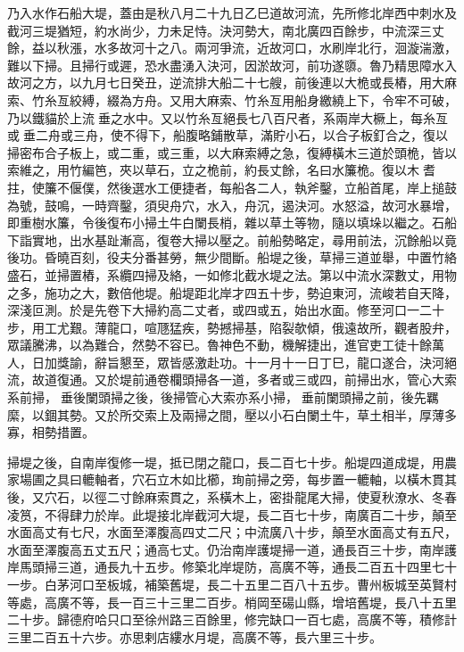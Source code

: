 \begin{pinyinscope}
 乃入水作石船大堤，蓋由是秋八月二十九日乙巳道故河流，先所修北岸西中刺水及截河三堤猶短，約水尚少，力未足恃。決河勢大，南北廣四百餘步，中流深三丈餘，益以秋漲，水多故河十之八。兩河爭流，近故河口，水刷岸北行，洄漩湍激，難以下掃。且掃行或遲，恐水盡湧入決河，因淤故河，前功遂隳。魯乃精思障水入故河之方，以九月七日癸丑，逆流排大船二十七艘，前後連以大桅或長樁，用大麻索、竹糸亙絞縛，綴為方舟。又用大麻索、竹糸亙用船身繳繞上下，令牢不可破，乃以鐵貓於上流垂之水中。又以竹糸亙絕長七八百尺者，系兩岸大橛上，每糸亙或垂二舟或三舟，使不得下，船腹略鋪散草，滿貯小石，以合子板釘合之，復以掃密布合子板上，或二重，或三重，以大麻索縛之急，復縛橫木三道於頭桅，皆以索維之，用竹編笆，夾以草石，立之桅前，約長丈餘，名曰水簾桅。復以木耆拄，使簾不偃僕，然後選水工便捷者，每船各二人，執斧鑿，立船首尾，岸上搥鼓為號，鼓鳴，一時齊鑿，須臾舟穴，水入，舟沉，遏決河。水怒溢，故河水暴增，即重樹水簾，令後復布小掃土牛白闌長梢，雜以草土等物，隨以填垛以繼之。石船下詣實地，出水基趾漸高，復卷大掃以壓之。前船勢略定，尋用前法，沉餘船以竟後功。昏曉百刻，役夫分番甚勞，無少間斷。船堤之後，草掃三道並舉，中置竹絡盛石，並掃置樁，系纜四掃及絡，一如修北截水堤之法。第以中流水深數丈，用物之多，施功之大，數倍他堤。船堤距北岸才四五十步，勢迫東河，流峻若自天降，深淺叵測。於是先卷下大掃約高二丈者，或四或五，始出水面。修至河口一二十步，用工尤艱。薄龍口，喧豗猛疾，勢撼掃基，陷裂欹傾，俄遠故所，觀者股弁，眾議騰沸，以為難合，然勢不容已。魯神色不動，機解捷出，進官吏工徒十餘萬人，日加獎諭，辭旨懇至，眾皆感激赴功。十一月十一日丁巳，龍口遂合，決河絕流，故道復通。又於堤前通卷欄頭掃各一道，多者或三或四，前掃出水，管心大索系前掃，垂後闌頭掃之後，後掃管心大索亦系小掃，垂前闌頭掃之前，後先羈縻，以錮其勢。又於所交索上及兩掃之間，壓以小石白闌土牛，草土相半，厚薄多寡，相勢措置。



 掃堤之後，自南岸復修一堤，抵已閉之龍口，長二百七十步。船堤四道成堤，用農家場圃之具曰轆軸者，穴石立木如比櫛，珣前掃之旁，每步置一轆軸，以橫木貫其後，又穴石，以徑二寸餘麻索貫之，系橫木上，密掛龍尾大掃，使夏秋潦水、冬春凌筼，不得肆力於岸。此堤接北岸截河大堤，長二百七十步，南廣百二十步，顛至水面高丈有七尺，水面至澤腹高四丈二尺；中流廣八十步，顛至水面高丈有五尺，水面至澤腹高五丈五尺；通高七丈。仍治南岸護堤掃一道，通長百三十步，南岸護岸馬頭掃三道，通長九十五步。修築北岸堤防，高廣不等，通長二百五十四里七十一步。白茅河口至板城，補築舊堤，長二十五里二百八十五步。曹州板城至英賢村等處，高廣不等，長一百三十三里二百步。梢岡至碭山縣，增培舊堤，長八十五里二十步。歸德府哈只口至徐州路三百餘里，修完缺口一百七處，高廣不等，積修計三里二百五十六步。亦思剌店縷水月堤，高廣不等，長六里三十步。




\end{pinyinscope}

